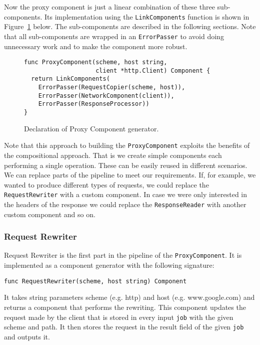 Now the proxy component is just a linear combination of these three
sub-components. Its implementation using the \texttt{LinkComponents}
function is shown in Figure~\ref{fig:ProxyComp} below. 
The sub-components are described in the
following sections. Note that all sub-components are wrapped
in an \texttt{ErrorPasser} to avoid doing unnecessary work 
and to make the component more robust.

\begin{figure}[h]
\centering
\begin{lstlisting}
func ProxyComponent(scheme, host string, 
                    client *http.Client) Component {
  return LinkComponents(
    ErrorPasser(RequestCopier(scheme, host)),
    ErrorPasser(NetworkComponent(client)),
    ErrorPasser(ResponseProcessor))
}
\end{lstlisting}
\caption[scale=1.0]{Declaration of Proxy Component generator.}
\label{fig:ProxyComp}
\end{figure}

Note that this approach to building the \texttt{ProxyComponent} exploits
the benefits of the compositional approach. That is we create simple
components each performing a single operation. These can be easily
reused in different scenarios. We can replace parts of the pipeline 
to meet our requirements. If, for example, we wanted to produce different
types of requests, we could replace the \texttt{RequestRewriter} with
a custom component. In case we were only interested in the headers of
the response we could replace the \texttt{ResponseReader} with another 
custom component and so on.

\subsubsection{Request Rewriter}
Request Rewriter is the first part in the pipeline of the 
\texttt{ProxyComponent}. It is implemented as a component generator with the 
following signature:
\begin{lstlisting}
func RequestRewriter(scheme, host string) Component
\end{lstlisting}
It takes string parameters scheme (e.g. http) and host (e.g. www.google.com) 
and returns a component that performs the rewriting. This component
updates the request made by the client that is stored in every input 
\texttt{job} with the given scheme and path. It then stores the 
request in the result field of the given \texttt{job} and outputs it.

